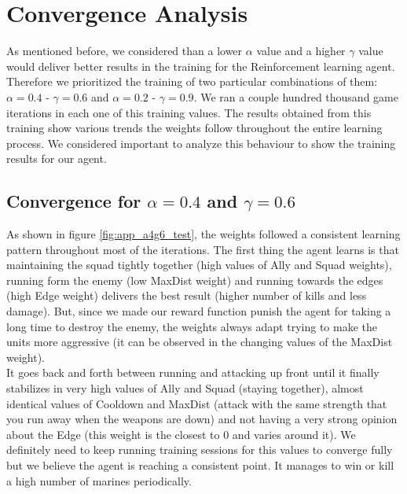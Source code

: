 
\section{Convergence Analysis}

As mentioned before, we considered than a lower $\alpha$ value and a higher $\gamma$ value would deliver better results in the training for the Reinforcement learning agent. Therefore we prioritized the training of two particular combinations of them: $\alpha= 0.4$ - $\gamma = 0.6$ and $\alpha= 0.2$ - $\gamma = 0.9$. We ran a couple hundred thousand game iterations in each one of this training values. The results obtained from this training show various trends the weights follow throughout the entire learning process. We considered important to analyze this behaviour to show the training results for our agent. \\

\subsection*{Convergence for $\alpha= 0.4$ and $\gamma = 0.6$}

As shown in figure \ref{fig:app_a4g6_test}, the weights followed a consistent learning pattern throughout most of the iterations. The first thing the agent learns is that maintaining the squad tightly together (high values of Ally and Squad weights), running form the enemy (low MaxDist weight) and running towards the edges (high Edge weight) delivers the best result (higher number of kills and less damage). But, since we made our reward function punish the agent for taking a long time to destroy the enemy, the weights always adapt trying to make the units more aggressive (it can be observed in the changing values of the MaxDist weight).\\

It goes back and forth between running and attacking up front until it finally stabilizes in very high values of Ally and Squad (staying together), almost identical values of Cooldown and MaxDist (attack with the same strength that you run away when the weapons are down) and not having a very strong opinion about the Edge (this weight is the closest to 0 and varies around it). We definitely need to keep running training sessions for this values to converge fully but we believe the agent is reaching a consistent point. It manages to win or kill a high number of marines periodically. 